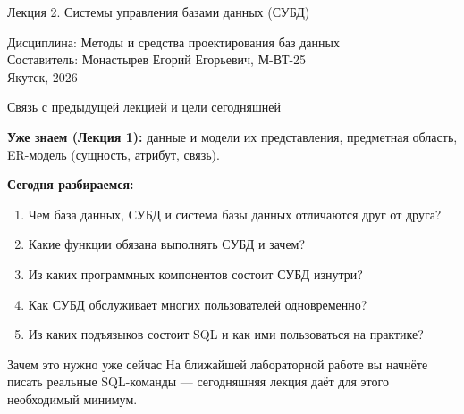 \documentclass[aspectratio=169]{beamer}
\begin{document}
\begin{frame}[plain]
  \vspace*{1cm}
  \begin{center}

    \colorbox{svfuDark}{%
      \parbox[c][2.8cm][c]{0.86\paperwidth}{%
        \centering
        {\LARGE\color{white}
          Лекция 2. Системы управления базами данных (СУБД)
        }
      }%
    }

  \end{center}

  \vfill

  \centering
  {\normalsize Дисциплина: Методы и средства проектирования баз данных}\\[4pt]
  {\small
    Составитель: Монастырев Егорий Егорьевич, М-ВТ-25
  }\\[4pt]

  {\small
    Якутск, 2026
  }

  \vfill

\end{frame}


\begin{frame}{Связь с предыдущей лекцией и цели сегодняшней}

\small
\textbf{Уже знаем (Лекция 1):} данные и модели их представления,
предметная область, ER-модель (сущность, атрибут, связь).

\vspace{0.4cm}

\textbf{Сегодня разбираемся:}
\begin{enumerate}
  \item Чем база данных, СУБД и система базы данных отличаются друг от друга?
  \item Какие функции обязана выполнять СУБД и зачем?
  \item Из каких программных компонентов состоит СУБД изнутри?
  \item Как СУБД обслуживает многих пользователей одновременно?
  \item Из каких подъязыков состоит SQL и как ими пользоваться на практике?
\end{enumerate}

\vspace{0.3cm}

\begin{alertblock}{Зачем это нужно уже сейчас}
На ближайшей лабораторной работе вы начнёте писать
реальные SQL-команды — сегодняшняя лекция даёт для этого
необходимый минимум.
\end{alertblock}

\end{frame}
\end{document}
